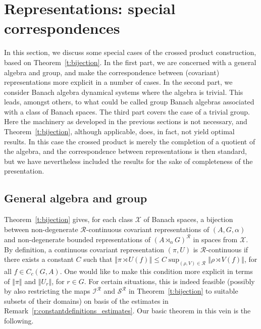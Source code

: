 \documentclass{amsart}
\theoremstyle{plain}
\theoremstyle{definition}
\numberwithin{equation}{section}
\begin{document}
\section{Representations: special correspondences}\label{sec:correspondences}

In this section, we discuss some special cases of the crossed product construction, based on Theorem~\ref{t:bijection}. In the first part, we are concerned with a general algebra and group, and make the correspondence between (covariant) representations more explicit in a number of cases. In the second part, we consider Banach algebra dynamical systems where the algebra is trivial. This leads, amongst others, to what could be called group Banach algebras associated with a class of Banach spaces. The third part covers the case of a trivial group. Here the machinery as developed in the previous sections is not necessary, and Theorem~\ref{t:bijection}, although applicable, does, in fact, not yield optimal results. In this case the crossed product is merely the completion of a quotient of the algebra, and the correspondence between representations is then standard, but we have nevertheless included the results for the sake of completeness of the presentation.

\subsection{General algebra and group}\label{subsec:general_algebra_and_group}

Theorem~\ref{t:bijection} gives, for each class ${\mathcal X}$ of Banach spaces, a bijection between non-degenerate ${\mathcal R}$-continuous covariant representations of ${(A,G,\alpha)}$ and non-degenerate bounded representations of ${(A {\rtimes}_\alpha G)^\mathcal{R}}$ in spaces from ${\mathcal X}$. By definition, a continuous covariant representation ${(\pi,U)}$ is ${\mathcal R}$-continuous if there exists a constant $C$ such that ${\left\Vert {{\pi \rtimes U} (f)} \right\Vert}\leq C\sup_{(\rho,V)\in{\mathcal R}}{\left\Vert {\rho\rtimes V(f)} \right\Vert}$, for all $f\in C_c(G,A)$. One would like to make this condition more explicit in terms of ${\left\Vert {\pi} \right\Vert}$ and ${\left\Vert {U_r} \right\Vert}$, for $r\in G$. For certain situations, this is indeed feasible (possibly by also restricting the maps ${{\mathcal I}^{\mathcal R}}$ and ${{\mathcal S}^{\mathcal R}}$ in Theorem~\ref{t:bijection} to suitable subsets of their domains) on basis of the estimates in Remark~\ref{r:constantdefinitions_estimates}. Our basic theorem in this vein is the following.
\end{document}
